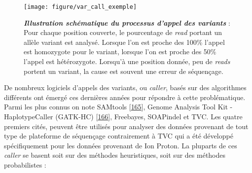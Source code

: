 \documentclass[12pt,a4paper,twoside]{ugathesis}
\theoremstyle{definition}
\theoremstyle{definition}
\theoremstyle{definition}
\theoremstyle{remark}
\begin{document}
\begin{figure}

{\centering \texttt{[image: figure/var\_call\_exemple]} 

}

\caption[Illustration schématique du processus d'appel des variants]{\textbf{\emph{Illustration schématique du
processus d'appel des variants}} : Pour chaque position couverte, le
pourcentage de \emph{read} portant un allèle variant est analysé.
Lorsque l'on est proche des 100\% l'appel est homozygote pour le
variant, lorsque l'on est proche des 50\% l'appel est hétérozygote.
Lorsqu'à une position donnée, peu de \emph{reads} portent un variant, la
cause est souvent une erreur de séquençage.}\label{fig:picvarcallprocess}
\end{figure}









De nombreux logiciels d'appels des variants, ou \emph{caller}, basés sur
des algorithmes différents ont émergé ces dernières années pour répondre
à cette problématique. Parmi les plus connus on note SAMtools
{[}\protect\hyperlink{ref-Li2009}{165}{]}, Genome Analysis Tool Kit -
HaplotypeCaller (GATK-HC)
{[}\protect\hyperlink{ref-McKenna2010}{166}{]}, Freebayes, SOAPindel et
TVC. Les quatre premiers cités, peuvent être utilisés pour analyser des
données provenant de tout type de plateforme de séquençage contrairement
à TVC qui a été développé spécifiquement pour les données provenant de
Ion Proton. La pluparts de ces \emph{caller} se basent soit sur des
méthodes heuristiques, soit sur des méthodes probabilistes :
\end{document}
